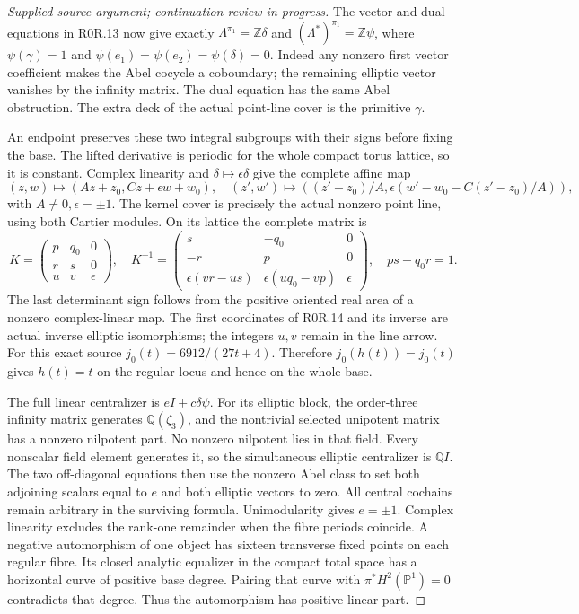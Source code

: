 \begin{proof}[Supplied source argument; continuation review in progress]
The vector and dual equations in R0R.13 now give exactly
\(\Lambda^{\pi_1}=\mathbb Z\delta\) and
\((\Lambda^*)^{\pi_1}=\mathbb Z\psi\), where
\(\psi(\gamma)=1\) and \(\psi(e_1)=\psi(e_2)=\psi(\delta)=0\).
Indeed any nonzero first vector coefficient makes the Abel cocycle a
coboundary; the remaining elliptic vector vanishes by the infinity
matrix. The dual equation has the same Abel obstruction. The extra
deck of the actual point-line cover is the primitive \(\gamma\).

An endpoint preserves these two integral subgroups with their signs
before fixing the base. The lifted derivative is periodic for the
whole compact torus lattice, so it is constant. Complex linearity
and \(\delta\mapsto\epsilon\delta\) give the complete affine map
\[
 (z,w)\mapsto(Az+z_0,Cz+\epsilon w+w_0),
 \quad (z',w')\mapsto
 ((z'-z_0)/A,\epsilon(w'-w_0-C(z'-z_0)/A)),         \tag{R0R.14}
\]
with \(A\ne0,\epsilon=\pm1\). The kernel cover is precisely the
actual nonzero point line, using both Cartier modules. On its lattice
the complete matrix is
\[
 K=\begin{pmatrix}p&q_0&0\\r&s&0\\u&v&\epsilon\end{pmatrix},
 \quad K^{-1}=\begin{pmatrix}s&-q_0&0\\-r&p&0\\
 \epsilon(vr-us)&\epsilon(uq_0-vp)&\epsilon\end{pmatrix},
 \quad ps-q_0r=1.                               \tag{R0R.15}
\]
The last determinant sign follows from the positive oriented real
area of a nonzero complex-linear map. The first coordinates of
R0R.14 and its inverse are actual inverse elliptic isomorphisms;
the integers \(u,v\) remain in the line arrow. For this exact
source \(j_0(t)=6912/(27t+4)\). Therefore
\(j_0(h(t))=j_0(t)\) gives \(h(t)=t\) on the regular locus and
hence on the whole base.

The full linear centralizer is \(eI+c\delta\psi\). For its elliptic
block, the order-three infinity matrix generates \(\mathbb Q(\zeta_3)\),
and the nontrivial selected unipotent matrix has a nonzero nilpotent
part. No nonzero nilpotent lies in that field. Every nonscalar field
element generates it, so the simultaneous elliptic centralizer is
\(\mathbb QI\). The two off-diagonal equations then use the nonzero
Abel class to set both adjoining scalars equal to \(e\) and both
elliptic vectors to zero. All central cochains remain arbitrary in
the surviving formula. Unimodularity gives \(e=\pm1\). Complex
linearity excludes the rank-one remainder when the fibre periods
coincide. A negative automorphism of one object has sixteen transverse
fixed points on each regular fibre. Its closed analytic equalizer in
the compact total space has a horizontal curve of positive base
degree. Pairing that curve with \(\pi^*H^2(\mathbb P^1)=0\) contradicts
that degree. Thus the automorphism has positive linear part.


\end{proof}
